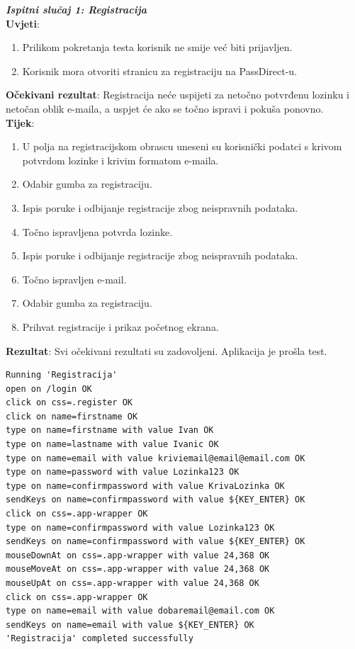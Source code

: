 {{{\noindent \textbf{\textit{Ispitni slučaj 1: Registracija}}\\
\textbf{Uvjeti}:
			 \begin{enumerate}
				\item Prilikom pokretanja testa korisnik ne smije već biti prijavljen.
				\item Korisnik mora otvoriti stranicu za registraciju na PassDirect-u.
			 \end{enumerate}
\textbf{Očekivani rezultat}: Registracija neće uspijeti za netočno potvrđenu lozinku i netočan oblik e-maila, a uspjet će ako se točno ispravi i pokuša ponovno.\\
\textbf{Tijek}:
			 \begin{enumerate}
			 	\item U polja na registracijskom obrascu uneseni su korisnički podatci s krivom potvrdom lozinke i krivim formatom e-maila.
			 	\item Odabir gumba za registraciju.
			 	\item Ispis poruke i odbijanje registracije zbog neispravnih podataka.
			 	\item Točno ispravljena potvrda lozinke.
			 	\item Ispis poruke i odbijanje registracije zbog neispravnih podataka.
			 	\item Točno ispravljen e-mail.
			 	\item Odabir gumba za registraciju.
			 	\item Prihvat registracije i prikaz početnog ekrana.
			 \end{enumerate}
			 \noindent \textbf{Rezultat}:
			 Svi očekivani rezultati su zadovoljeni. Aplikacija je prošla test. \\

\begin{lstlisting}
Running 'Registracija'
open on /login OK
click on css=.register OK
click on name=firstname OK
type on name=firstname with value Ivan OK
type on name=lastname with value Ivanic OK
type on name=email with value kriviemail@email@email.com OK
type on name=password with value Lozinka123 OK
type on name=confirmpassword with value KrivaLozinka OK
sendKeys on name=confirmpassword with value ${KEY_ENTER} OK
click on css=.app-wrapper OK
type on name=confirmpassword with value Lozinka123 OK
sendKeys on name=confirmpassword with value ${KEY_ENTER} OK
mouseDownAt on css=.app-wrapper with value 24,368 OK
mouseMoveAt on css=.app-wrapper with value 24,368 OK
mouseUpAt on css=.app-wrapper with value 24,368 OK
click on css=.app-wrapper OK
type on name=email with value dobaremail@email.com OK
sendKeys on name=email with value ${KEY_ENTER} OK
'Registracija' completed successfully
\end{lstlisting}}\hfill\break





}}
